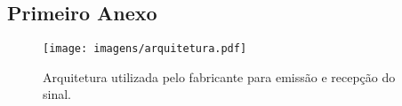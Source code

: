 \begin{anexosenv}

\partanexos
\chapter{Primeiro Anexo}

\begin{figure}[H]
    \centering
   \texttt{[image: imagens/arquitetura.pdf]}
  \caption{Arquitetura utilizada pelo fabricante para emissão e recepção do sinal.}
   \label{arquitetura1}
    \end{figure}
	

\end{anexosenv}

